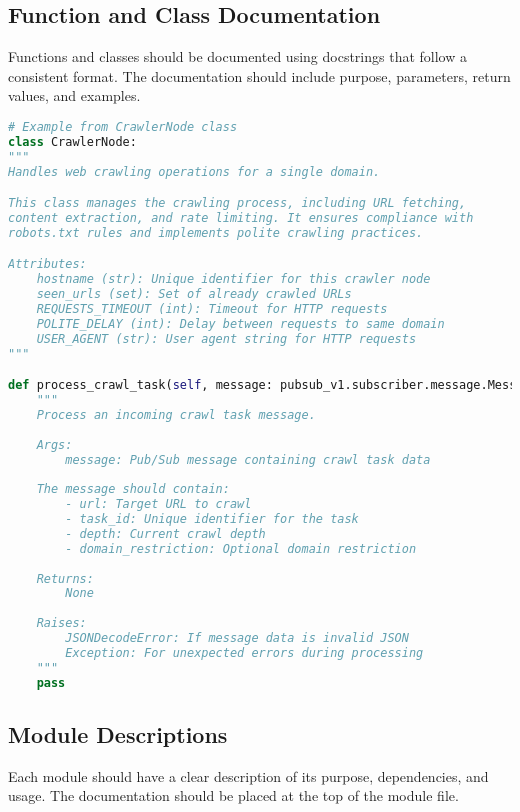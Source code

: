 \documentclass[12pt,a4paper]{report}
\begin{document}
\subsection{Function and Class Documentation}
Functions and classes should be documented using docstrings that follow a consistent format. The documentation should include purpose, parameters, return values, and examples.

\begin{lstlisting}[language=Python]
# Example from CrawlerNode class
class CrawlerNode:
"""
Handles web crawling operations for a single domain.

This class manages the crawling process, including URL fetching,
content extraction, and rate limiting. It ensures compliance with
robots.txt rules and implements polite crawling practices.

Attributes:
    hostname (str): Unique identifier for this crawler node
    seen_urls (set): Set of already crawled URLs
    REQUESTS_TIMEOUT (int): Timeout for HTTP requests
    POLITE_DELAY (int): Delay between requests to same domain
    USER_AGENT (str): User agent string for HTTP requests
"""

def process_crawl_task(self, message: pubsub_v1.subscriber.message.Message):
    """
    Process an incoming crawl task message.
    
    Args:
        message: Pub/Sub message containing crawl task data
        
    The message should contain:
        - url: Target URL to crawl
        - task_id: Unique identifier for the task
        - depth: Current crawl depth
        - domain_restriction: Optional domain restriction
        
    Returns:
        None
        
    Raises:
        JSONDecodeError: If message data is invalid JSON
        Exception: For unexpected errors during processing
    """
    pass
\end{lstlisting}

\subsection{Module Descriptions}
Each module should have a clear description of its purpose, dependencies, and usage. The documentation should be placed at the top of the module file.
\end{document}
